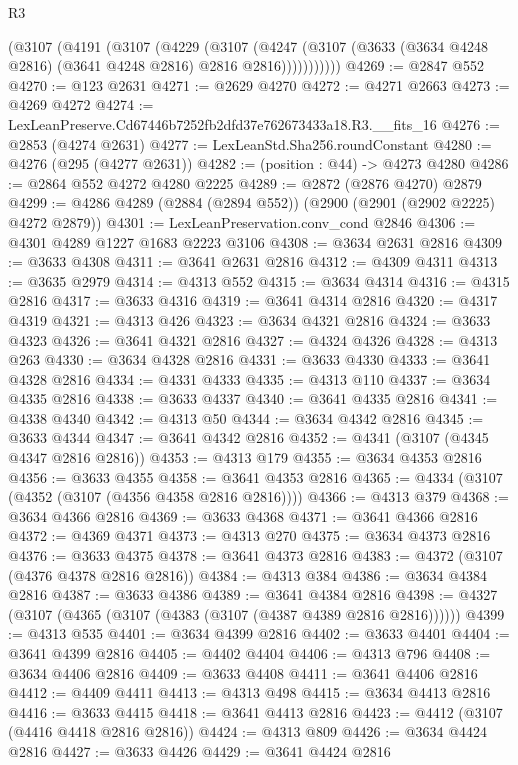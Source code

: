 \begin{lexlean}{R3}
\begin{coremodule}
          (@3107
            (@4191
              (@3107
                (@4229
                  (@3107
                    (@4247
                      (@3107 (@3633 (@3634 @4248 @2816) (@3641 @4248 @2816) @2816 @2816)))))))))))
@4269 := @2847 @552
@4270 := @123 @2631
@4271 := @2629 @4270
@4272 := @4271 @2663
@4273 := @4269 @4272
@4274 := LexLeanPreserve.Cd67446b7252fb2dfd37e762673433a18.R3.__fits_16
@4276 := @2853 (@4274 @2631)
@4277 := LexLeanStd.Sha256.roundConstant
@4280 := @4276 (@295 (@4277 @2631))
@4282 := (position : @44) -> @4273 @4280
@4286 := @2864 @552 @4272 @4280 @2225
@4289 := @2872 (@2876 @4270) @2879
@4299 := @4286 @4289 (@2884 (@2894 @552)) (@2900 (@2901 (@2902 @2225) @4272 @2879))
@4301 := LexLeanPreservation.conv_cond @2846
@4306 := @4301 @4289 @1227 @1683 @2223 @3106
@4308 := @3634 @2631 @2816
@4309 := @3633 @4308
@4311 := @3641 @2631 @2816
@4312 := @4309 @4311
@4313 := @3635 @2979
@4314 := @4313 @552
@4315 := @3634 @4314
@4316 := @4315 @2816
@4317 := @3633 @4316
@4319 := @3641 @4314 @2816
@4320 := @4317 @4319
@4321 := @4313 @426
@4323 := @3634 @4321 @2816
@4324 := @3633 @4323
@4326 := @3641 @4321 @2816
@4327 := @4324 @4326
@4328 := @4313 @263
@4330 := @3634 @4328 @2816
@4331 := @3633 @4330
@4333 := @3641 @4328 @2816
@4334 := @4331 @4333
@4335 := @4313 @110
@4337 := @3634 @4335 @2816
@4338 := @3633 @4337
@4340 := @3641 @4335 @2816
@4341 := @4338 @4340
@4342 := @4313 @50
@4344 := @3634 @4342 @2816
@4345 := @3633 @4344
@4347 := @3641 @4342 @2816
@4352 := @4341 (@3107 (@4345 @4347 @2816 @2816))
@4353 := @4313 @179
@4355 := @3634 @4353 @2816
@4356 := @3633 @4355
@4358 := @3641 @4353 @2816
@4365 := @4334 (@3107 (@4352 (@3107 (@4356 @4358 @2816 @2816))))
@4366 := @4313 @379
@4368 := @3634 @4366 @2816
@4369 := @3633 @4368
@4371 := @3641 @4366 @2816
@4372 := @4369 @4371
@4373 := @4313 @270
@4375 := @3634 @4373 @2816
@4376 := @3633 @4375
@4378 := @3641 @4373 @2816
@4383 := @4372 (@3107 (@4376 @4378 @2816 @2816))
@4384 := @4313 @384
@4386 := @3634 @4384 @2816
@4387 := @3633 @4386
@4389 := @3641 @4384 @2816
@4398 := @4327 (@3107 (@4365 (@3107 (@4383 (@3107 (@4387 @4389 @2816 @2816))))))
@4399 := @4313 @535
@4401 := @3634 @4399 @2816
@4402 := @3633 @4401
@4404 := @3641 @4399 @2816
@4405 := @4402 @4404
@4406 := @4313 @796
@4408 := @3634 @4406 @2816
@4409 := @3633 @4408
@4411 := @3641 @4406 @2816
@4412 := @4409 @4411
@4413 := @4313 @498
@4415 := @3634 @4413 @2816
@4416 := @3633 @4415
@4418 := @3641 @4413 @2816
@4423 := @4412 (@3107 (@4416 @4418 @2816 @2816))
@4424 := @4313 @809
@4426 := @3634 @4424 @2816
@4427 := @3633 @4426
@4429 := @3641 @4424 @2816

\end{coremodule}
\end{lexlean}
